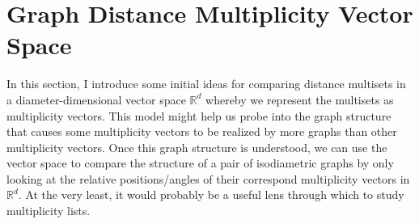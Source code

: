\documentclass[12]{article}
\newcommand{\R}{\mathbb{R}}
\newtheorem{prop}[thm]{Proposition}
\theoremstyle{definition}
\begin{document}
	
	
	

	
	\section{Graph Distance Multiplicity Vector Space}
	
	In this section, I introduce some initial ideas for comparing distance multisets in a diameter-dimensional vector space $\R^d$ whereby we represent the multisets as multiplicity vectors.  This model might help us probe into the graph structure that causes some multiplicity vectors to be realized by more graphs than other multiplicity vectors.  Once this graph structure is understood, we can use the vector space to compare the structure of a pair of isodiametric graphs by only looking at the relative positions/angles of their correspond multiplicity vectors in $\R^d$.  At the very least, it would probably be a useful lens through which to study multiplicity lists.
	
\end{document}
